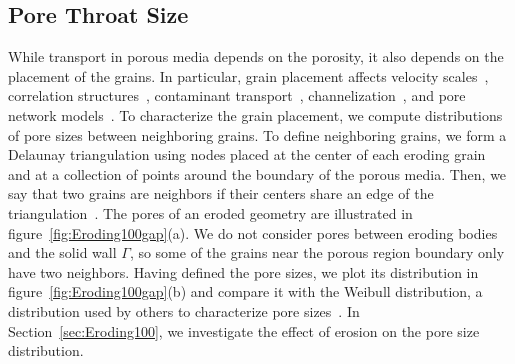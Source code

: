 \documentclass{jfm}
\begin{document}
\subsection{Pore Throat Size}
\label{sec:throats}
While transport in porous media depends on the porosity, it also depends
on the placement of the grains.  In particular, grain placement affects
velocity scales~\citep{ali-par-wei-bre2017}, correlation
structures~\citep{leb-ded-dav-bou2007}, contaminant
transport~\citep{knu-car2005},
channelization~\citep{sie-ili-pri-riv-gua2019,berhanu2012shape}, and
pore network models~\citep{bry-kin-mel1993, bry-mel-cad1993,
bij-blu2006}. To characterize the grain placement, we compute
distributions of pore sizes between neighboring grains.  To define
neighboring grains, we form a Delaunay triangulation using nodes placed
at the center of each eroding grain and at a collection of points around
the boundary of the porous media.  Then, we say that two grains are
neighbors if their centers share an edge of the
triangulation~\citep{dea-qua-bir-jua2018}. The pores of an eroded
geometry are illustrated in figure~\ref{fig:Eroding100gap}(a). We do not
consider pores between eroding bodies and the solid wall $\Gamma$, so
some of the grains near the porous region boundary only have two
neighbors. Having defined the pore sizes, we plot its distribution in
figure~\ref{fig:Eroding100gap}(b) and compare it with the Weibull
distribution, a distribution used by others to characterize pore
sizes~\citep{ioa-cha1993}.  In Section~\ref{sec:Eroding100}, we
investigate the effect of erosion on the pore size distribution.
\end{document}
